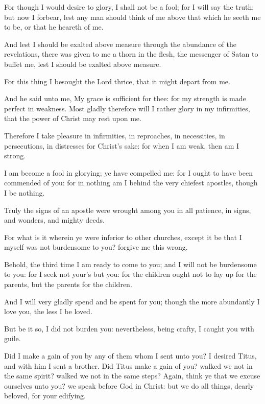 \verse For though I would desire to glory, I shall not be a fool; for I will say the truth: but now I forbear, lest any man should think of me above that which he seeth me to be, or that he heareth of me.

\verse And lest I should be exalted above measure through the abundance of the revelations, there was given to me a thorn in the flesh, the messenger of Satan to buffet me, lest I should be exalted above measure.

\verse For this thing I besought the Lord thrice, that it might depart from me.

\verse And he said unto me, My grace is sufficient for thee: for my strength is made perfect in weakness. Most gladly therefore will I rather glory in my infirmities, that the power of Christ may rest upon me.

\verse Therefore I take pleasure in infirmities, in reproaches, in necessities, in persecutions, in distresses for Christ's sake: for when I am weak, then am I strong.

\verse I am become a fool in glorying; ye have compelled me: for I ought to have been commended of you: for in nothing am I behind the very chiefest apostles, though I be nothing.

\verse Truly the signs of an apostle were wrought among you in all patience, in signs, and wonders, and mighty deeds.

\verse For what is it wherein ye were inferior to other churches, except it be that I myself was not burdensome to you? forgive me this wrong.

\verse Behold, the third time I am ready to come to you; and I will not be burdensome to you: for I seek not your's but you: for the children ought not to lay up for the parents, but the parents for the children.

\verse And I will very gladly spend and be spent for you; though the more abundantly I love you, the less I be loved.

\verse But be it so, I did not burden you: nevertheless, being crafty, I caught you with guile.

\verse Did I make a gain of you by any of them whom I sent unto you?  \verse I desired Titus, and with him I sent a brother. Did Titus make a gain of you? walked we not in the same spirit? walked we not in the same steps?  \verse Again, think ye that we excuse ourselves unto you?  we speak before God in Christ: but we do all things, dearly beloved, for your edifying.

